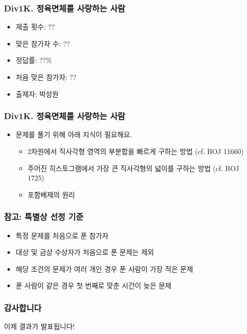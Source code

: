 \documentclass[xetex]{beamer}
\begin{document}
\begin{frame}
  \frametitle{Div1K. 정육면체를 사랑하는 사람}
  \begin{itemize}
    \item 제출 횟수: ??
    \item 맞은 참가자 수: ??
    \item 정답률: ??\%
    \item 처음 맞은 참가자: ??
    \item 출제자: 박성원
  \end{itemize}
\end{frame}

\begin{frame}
  \frametitle{Div1K. 정육면체를 사랑하는 사람}
  \begin{itemize}
    \item 문제를 풀기 위해 아래 지식이 필요해요.
    \begin{itemize}
      \item 2차원에서 직사각형 영역의 부분합을 빠르게 구하는 방법 (cf. BOJ 11660)
      \item 주어진 히스토그램에서 가장 큰 직사각형의 넓이를 구하는 방법 (cf. BOJ 1725)
      \item 포함배제의 원리
    \end{itemize}
  \end{itemize}
\end{frame}



\begin{frame}
  \frametitle{참고: 특별상 선정 기준}
  \begin{itemize}
    \item 특정 문제를 처음으로 푼 참가자
    \item 대상 및 금상 수상자가 처음으로 푼 문제는 제외
    \item 해당 조건의 문제가 여러 개인 경우 푼 사람이 가장 적은 문제
    \item 푼 사람이 같은 경우 첫 번째로 맞춘 시간이 늦은 문제
  \end{itemize}
\end{frame}

\begin{frame}
  \frametitle{감사합니다}
  \begin{center}
    이제 결과가 발표됩니다!
  \end{center}
\end{frame}
\end{document}
